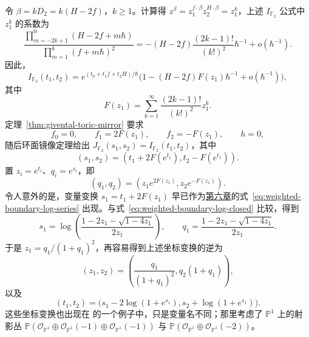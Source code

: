 \begin{example}
令 $\beta=kD_2=k(H-2f)$，$k\ge1$。计算得 $z^\beta=z_1^{f\cdot\beta}z_2^{H\cdot\beta}=z_1^k$，上述 $I_{\mathbb F_2}$ 公式中 $z_1^k$ 的系数为
\[
\frac{\prod_{m=-2k+1}^0(H-2f+m\hbar)}{\prod_{m=1}^k(f+m\hbar)^2}
=-(H-2f)\frac{(2k-1)!}{(k!)^2}\hbar^{-1}+o(\hbar^{-1}).
\]
因此，
\[
I_{\mathbb F_2}(t_1,t_2)=e^{(t_0+t_1f+t_2H)/\hbar}
\bigl(1-(H-2f)F(z_1)\hbar^{-1}+o(\hbar^{-1})\bigr),
\]
其中
\[
F(z_1)=\sum_{k=1}^{\infty}\frac{(2k-1)!}{(k!)^2}z_1^k.
\]
定理~\ref{thm:givental-toric-mirror} 要求
\[
f_0=0,\qquad f_1=2F(z_1),\qquad f_2=-F(z_1),\qquad h=0,
\]
随后环面镜像定理给出 $J_{\mathbb F_2}(s_1,s_2)=I_{\mathbb F_2}(t_1,t_2)$，其中
\[
(s_1,s_2)=(t_1+2F(e^{t_1}),t_2-F(e^{t_1})).
\]
置 $z_i=e^{t_i}$、$q_i=e^{s_i}$，即
\begin{equation}\label{eq:hirzebruch-two-mirror-coordinate-change}
(q_1,q_2)=(z_1e^{2F(z_1)},z_2e^{-F(z_1)}).
\end{equation}
令人意外的是，变量变换 $s_1=t_1+2F(z_1)$ 早已作为\hyperref[chap:moduli]{第六章}的式~\eqref{eq:weighted-boundary-log-series} 出现。与式~\eqref{eq:weighted-boundary-log-closed} 比较，得到
\[
s_1=\log\left(\frac{1-2z_1-\sqrt{1-4z_1}}{2z_1}\right),\qquad
q_1=\frac{1-2z_1-\sqrt{1-4z_1}}{2z_1}.
\]
于是 $z_1=q_1/(1+q_1)^2$，再容易得到上述坐标变换的逆为
\begin{equation}\label{eq:hirzebruch-two-inverse-mirror-coordinates}
(z_1,z_2)=\left(\frac{q_1}{(1+q_1)^2},q_2(1+q_1)\right),
\end{equation}
以及
\begin{equation}\label{eq:hirzebruch-two-inverse-log-coordinates}
(t_1,t_2)=\bigl(s_1-2\log(1+e^{s_1}),s_2+\log(1+e^{s_1})\bigr).
\end{equation}
这些坐标变换也出现在  的一个例子中，只是变量名不同；那里考虑了 $\mathbb P^1$ 上的射影丛
$\mathbb P(\mathcal O_{\mathbb P^1}\oplus\mathcal O_{\mathbb P^1}(-1)\oplus\mathcal O_{\mathbb P^1}(-1))$ 与
$\mathbb P(\mathcal O_{\mathbb P^1}\oplus\mathcal O_{\mathbb P^1}(-2))$。


\end{example}
